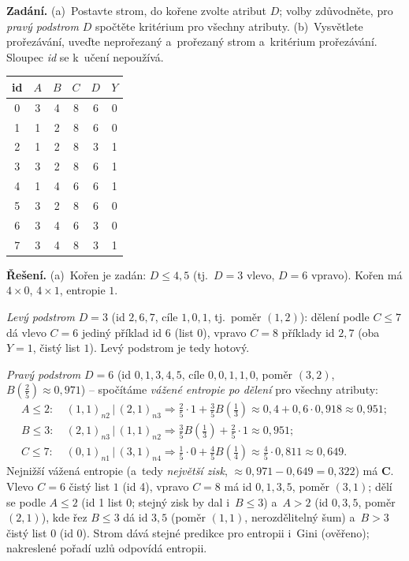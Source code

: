 \begin{priklad}
\par
\textbf{Zadání.} (a)~Postavte strom, do kořene zvolte atribut $D$; volby zdůvodněte, pro \emph{pravý podstrom} $D$ spočtěte kritérium pro všechny atributy. (b)~Vysvětlete prořezávání, uveďte neprořezaný a~prořezaný strom a~kritérium prořezávání. Sloupec \emph{id} se k~učení nepoužívá.

\smallskip
\begin{center}\small
\begin{tabular}{cccccc}\toprule
id & $A$ & $B$ & $C$ & $D$ & $Y$ \\\midrule
0 & 3 & 4 & 8 & 6 & 0 \\ 1 & 1 & 2 & 8 & 6 & 0 \\ 2 & 1 & 2 & 8 & 3 & 1 \\ 3 & 3 & 2 & 8 & 6 & 1 \\
4 & 1 & 4 & 6 & 6 & 1 \\ 5 & 3 & 2 & 8 & 6 & 0 \\ 6 & 3 & 4 & 6 & 3 & 0 \\ 7 & 3 & 4 & 8 & 3 & 1 \\\bottomrule
\end{tabular}
\end{center}

\smallskip
\textbf{Řešení.} (a)~Kořen je zadán: $D\le 4{,}5$ (tj.\ $D{=}3$ vlevo, $D{=}6$ vpravo). Kořen má $4\times 0$, $4\times 1$, entropie $1$.

\emph{Levý podstrom} $D{=}3$ (id $2,6,7$, cíle $1,0,1$, tj.\ poměr $(1,2)$): dělení podle $C\le 7$ dá vlevo $C{=}6$ jediný příklad id 6 (list $0$), vpravo $C{=}8$ příklady id $2,7$ (oba $Y{=}1$, čistý list $1$). Levý podstrom je tedy hotový.

\emph{Pravý podstrom} $D{=}6$ (id $0,1,3,4,5$, cíle $0,0,1,1,0$, poměr $(3,2)$, $B(\tfrac25)\approx 0{,}971$) -- spočítáme \emph{vážené entropie po dělení} pro všechny atributy:
\[
\begin{aligned}
A\le 2:\ & (1,1)_{n2}\,|\,(2,1)_{n3} \Rightarrow \tfrac25\cdot 1 + \tfrac35 B(\tfrac13) \approx 0{,}4 + 0{,}6\cdot 0{,}918 \approx \boxed{0{,}951};\\
B\le 3:\ & (2,1)_{n3}\,|\,(1,1)_{n2} \Rightarrow \tfrac35 B(\tfrac13)+\tfrac25\cdot 1 \approx \boxed{0{,}951};\\
C\le 7:\ & (0,1)_{n1}\,|\,(3,1)_{n4} \Rightarrow \tfrac15\cdot 0 + \tfrac45 B(\tfrac14) \approx \tfrac45\cdot 0{,}811 \approx \boxed{0{,}649}.
\end{aligned}
\]
Nejnižší vážená entropie (a~tedy \emph{největší zisk}, $\approx 0{,}971-0{,}649=0{,}322$) má $\mathbf{C}$. Vlevo $C{=}6$ čistý list $1$ (id 4), vpravo $C{=}8$ má id $0,1,3,5$, poměr $(3,1)$; dělí se podle $A\le 2$ (id 1 list $0$; stejný zisk by dal i~$B\le 3$) a~$A>2$ (id $0,3,5$, poměr $(2,1)$), kde řez $B\le 3$ dá id $3,5$ (poměr $(1,1)$, nerozdělitelný šum) a~$B>3$ čistý list $0$ (id $0$). Strom dává stejné predikce pro entropii i~Gini (ověřeno); nakreslené pořadí uzlů odpovídá entropii.


\end{priklad}
